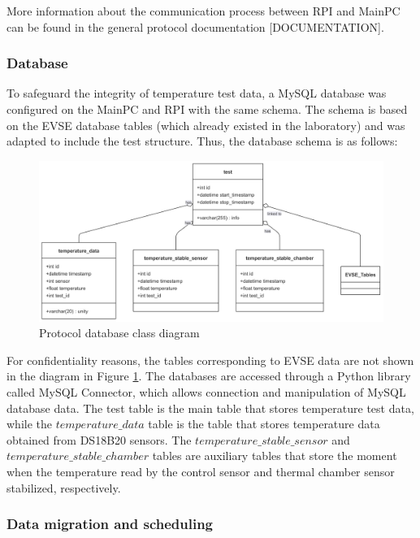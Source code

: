 More information about the communication process between RPI and MainPC can be found in the general protocol documentation [DOCUMENTATION].

\subsubsection{Database}

To safeguard the integrity of temperature test data, a MySQL database was configured on the MainPC and RPI with the same schema. The schema is based on the EVSE database tables (which already existed in the laboratory) and was adapted to include the test structure. Thus, the database schema is as follows:

\begin{figure}[H]
    \centering
    \includegraphics[width=\textwidth]{figures/class_diagram.png}
    \caption{Protocol database class diagram}
    \label{fig:class_diagram}
\end{figure}

For confidentiality reasons, the tables corresponding to EVSE data are not shown in the diagram in Figure \ref{fig:class_diagram}.
The databases are accessed through a Python library called MySQL Connector, which allows connection and manipulation of MySQL database data. The test table is the main table that stores temperature test data, while the $\mathit{temperature\_data}$ table is the table that stores temperature data obtained from DS18B20 sensors. The $\mathit{temperature\_stable\_sensor}$ and $\mathit{temperature\_stable\_chamber}$ tables are auxiliary tables that store the moment when the temperature read by the control sensor and thermal chamber sensor stabilized, respectively.

\subsubsection{Data migration and scheduling}

